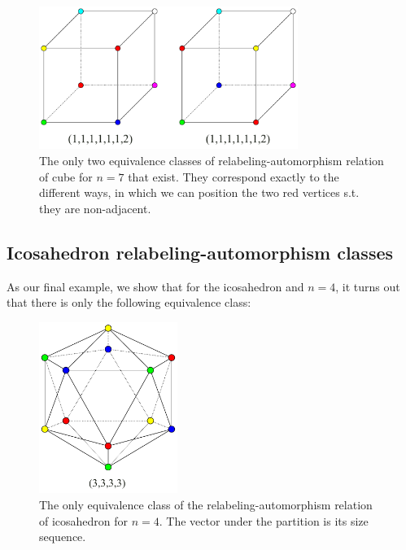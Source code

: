 \begin{figure}[H]
    \centering
    \includegraphics[width=0.75\textwidth]{Resources/Figs/cube_non_relaut-7-clrings.pdf}
    \caption{The only two equivalence classes of relabeling-automorphism relation of cube for $n=7$ that exist. They correspond exactly to the different ways, in which we can position the two red vertices s.t. they are non-adjacent.}
    \label{fig:cube-7clring-relaut-classes}
\end{figure}

\subsection{Icosahedron relabeling-automorphism classes}

As our final example, we show that for the icosahedron and $n=4$, it turns out that there is only the following equivalence class:

\begin{figure}[H]
    \centering
    \includegraphics[width=0.4\textwidth]{Resources/Figs/icosahedron_non_relaut-4-clrings.pdf}
    \caption{The only equivalence class of the relabeling-automorphism relation of icosahedron for $n=4$. The vector under the partition is its size sequence.}
    \label{fig:icosahedron-4clring-relaut-classes}
\end{figure}


